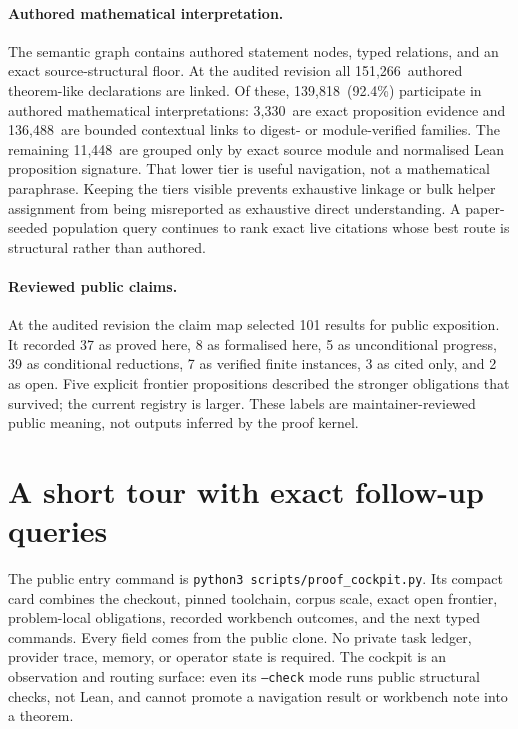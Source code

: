\documentclass[11pt]{article}
\newcommand{\SemanticAuthoredTheoremLike}{151,266}
\newcommand{\SemanticAuthoredInterpreted}{139,818}
\newcommand{\SemanticDirectEvidence}{3,330}
\newcommand{\SemanticContextual}{136,488}
\newcommand{\SemanticStructuralOnly}{11,448}
\newcommand{\SemanticAuthoredPercent}{92.4}
\begin{document}
\paragraph{Authored mathematical interpretation.}
The semantic graph contains authored statement nodes, typed relations, and an
exact source-structural floor. At the audited revision all
\SemanticAuthoredTheoremLike\ authored theorem-like declarations are linked.
Of these, \SemanticAuthoredInterpreted\ (\SemanticAuthoredPercent\%) participate
in authored mathematical interpretations: \SemanticDirectEvidence\ are exact
proposition evidence and \SemanticContextual\ are bounded contextual links to
digest- or module-verified families. The remaining \SemanticStructuralOnly\ are grouped only by exact source
module and normalised Lean proposition signature. That lower tier is useful
navigation, not a mathematical paraphrase. Keeping the tiers visible prevents
exhaustive linkage or bulk helper assignment from being misreported as
exhaustive direct understanding. A paper-seeded population query continues to
rank exact live citations whose best route is structural rather than authored.

\paragraph{Reviewed public claims.}
At the audited revision the claim map selected 101 results for public exposition.
It recorded 37 as proved here, 8 as formalised here, 5 as unconditional progress,
39 as conditional reductions, 7 as verified finite instances, 3 as cited only,
and 2 as open. Five explicit frontier propositions described the stronger
obligations that survived; the current registry is larger. These labels are maintainer-reviewed public meaning,
not outputs inferred by the proof kernel.

\section{A short tour with exact follow-up queries}\label{sec:tour}

The public entry command is
\texttt{python3 scripts/proof\_cockpit.py}.  Its compact card combines the
checkout, pinned toolchain, corpus scale, exact open frontier, problem-local
obligations, recorded workbench outcomes, and the next typed commands.  Every
field comes from the public clone.  No private task ledger, provider trace,
memory, or operator state is required.  The cockpit is an observation and
routing surface: even its \texttt{--check} mode runs public structural checks,
not Lean, and cannot promote a navigation result or workbench note into a
theorem.
\end{document}
